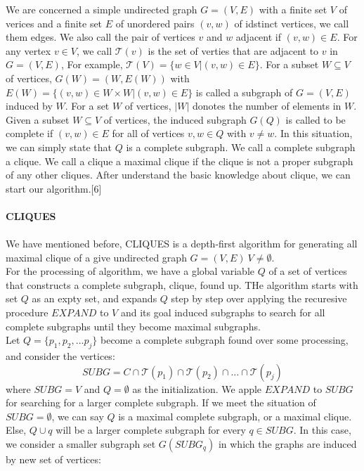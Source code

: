 We are concerned a simple undirected graph $G=(V,E)$ with a finite set $V$ of verices and a finite set $E$ of unordered pairs $(v,w)$ of idstinct vertices, we call them edges. We also call the pair of vertices $v$ and $w$ adjacent if $(v,w)\in E$. For any vertex $v\in V$, we call $\mathcal{T}(v)$ is the set of verties that are adjacent to $v$ in $G = (V,E)$, For example, $\mathcal{T}(V) = \{w\in V | (v,w)\in E\}$. For a subset $W \subseteq V$ of vertices, $G(W) = (W,E(W))$ with $E(W)=\{(v,w)\in W \times W|(v,w)\in E\}$ is called a subgraph of $G = (V,E)$ induced by $W$. For a set $W$ of vertices, $|W|$ donotes the number of elements in $W$. Given a subset $W \subseteq V$ of vertices, the induced subgraph $G(Q)$ is called to be complete if $(v,w)\in E$ for all of vertices $v,w \in Q$ with $v \ne w$. In this situation, we can simply state that $Q$ is a complete subgraph. We call a complete subgraph a clique. We call a clique a maximal clique if the clique is not a proper subgraph of any other cliques. After understand the basic knowledge about clique, we can start our algorithm.[6]\\ \\
\textbf{CLIQUES}
\\ \\
We have mentioned before, CLIQUES is a depth-first algorithm for generating all maximal clique of a give undirected graph $G=(V,E)\ V\ne \emptyset$.\\
For the processing of algorithm, we have a global variable $Q$ of a set of vertices that constructs a complete subgraph, clique, found up. THe algorithm starts with set $Q$ as an expty set, and expands $Q$ step by step over applying the recuresive procedure $EXPAND$ to $V$ and its goal induced subgraphs to search for all complete subgraphs until they become maximal subgraphs.\\
Let $Q = \{p_1,p_2,...p_j\}$ become a complete subgraph found over some processing, and consider the vertices:
\begin{displaymath}
SUBG = C \cap \mathcal{T}(p_1)\cap \mathcal{T}(p_2)\cap ... \cap\mathcal{T}(p_j)
\end{displaymath}
where $SUBG=V$ and $Q = \emptyset$ as the initialization. We apple $EXPAND$ to $SUBG$ for searching for a larger complete subgraph. If we meet the situation of $SUBG = \emptyset$, we can say $Q$ is a maximal complete subgraph, or a maximal clique. Else, $Q\cup{q}$ will be a larger complete subgraph for every $q\in SUBG$. In this case, we consider a smaller subgraph set $G(SUBG_q)$ in which the graphs are induced by new set of vertices:
